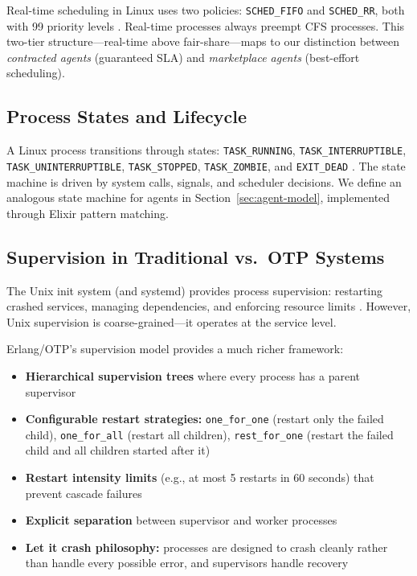 \documentclass[12pt,a4paper]{article}
\theoremstyle{definition}
\theoremstyle{remark}
\begin{document}
Real-time scheduling in Linux uses two policies: \texttt{SCHED\_FIFO} and \texttt{SCHED\_RR}, both with 99 priority levels \citep{bovet2005understanding}. Real-time processes always preempt CFS processes. This two-tier structure---real-time above fair-share---maps to our distinction between \emph{contracted agents} (guaranteed SLA) and \emph{marketplace agents} (best-effort scheduling).

\subsection{Process States and Lifecycle}

A Linux process transitions through states: \texttt{TASK\_RUNNING}, \texttt{TASK\_INTERRUPTIBLE}, \texttt{TASK\_UNINTERRUPTIBLE}, \texttt{TASK\_STOPPED}, \texttt{TASK\_ZOMBIE}, and \texttt{EXIT\_DEAD} \citep{bovet2005understanding}. The state machine is driven by system calls, signals, and scheduler decisions. We define an analogous state machine for agents in Section~\ref{sec:agent-model}, implemented through Elixir pattern matching.

\subsection{Supervision in Traditional vs.\ OTP Systems}

The Unix init system (and systemd) provides process supervision: restarting crashed services, managing dependencies, and enforcing resource limits \citep{poettering2010systemd}. However, Unix supervision is coarse-grained---it operates at the service level.

Erlang/OTP's supervision model \citep{armstrong2003making} provides a much richer framework:

\begin{itemize}[leftmargin=2em]
  \item \textbf{Hierarchical supervision trees} where every process has a parent supervisor
  \item \textbf{Configurable restart strategies:} \texttt{one\_for\_one} (restart only the failed child), \texttt{one\_for\_all} (restart all children), \texttt{rest\_for\_one} (restart the failed child and all children started after it)
  \item \textbf{Restart intensity limits} (e.g., at most 5 restarts in 60 seconds) that prevent cascade failures
  \item \textbf{Explicit separation} between supervisor and worker processes
  \item \textbf{Let it crash philosophy:} processes are designed to crash cleanly rather than handle every possible error, and supervisors handle recovery
\end{itemize}
\end{document}

